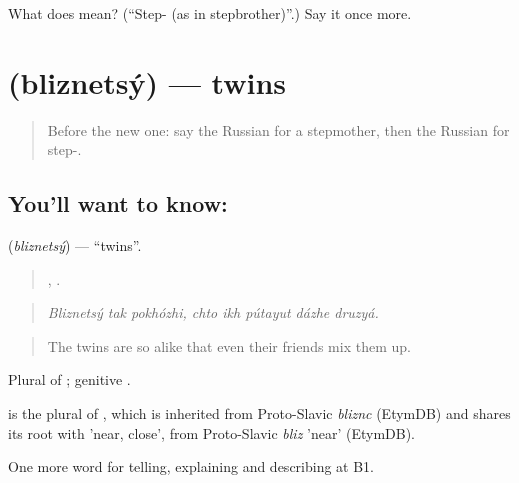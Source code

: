 \begin{tcolorbox}[breakable,colback=teal!4,colframe=teal!35!black,title={Before you move on}]
What does  mean? (\textquotedblleft{}Step- (as in stepbrother)\textquotedblright{}.) Say it once more.
\end{tcolorbox}
\section[\texorpdfstring{\ru{близнецы} (bliznetsý)}{близнецы (bliznetsý)}]{ (bliznetsý) — twins}

\label{lesson:RU-C492-bliznetsy}



\begin{quote}
Before the new one: say the Russian for a stepmother, then the Russian for step-.
\end{quote}

\subsection*{You'll want to know: }
\textbf{} (\emph{bliznetsý}) — \textquotedblleft{}twins\textquotedblright{}.

\begin{quote}
  ,     .
\end{quote}

\begin{quote}
\emph{Bliznetsý tak pokhózhi, chto ikh pútayut dázhe druzyá.}
\end{quote}

\begin{quote}
The twins are so alike that even their friends mix them up.
\end{quote}

Plural of \emph{}; genitive .

\begin{cousinweb}
\emph{} is the plural of \emph{}, which is inherited from Proto-Slavic \emph{bliznc} (EtymDB) and shares its root with \emph{} 'near, close', from Proto-Slavic \emph{bliz} 'near' (EtymDB).
\end{cousinweb}

\begin{grammarlens}[title={What you've built}]
One more word for telling, explaining and describing at B1.
\end{grammarlens}

